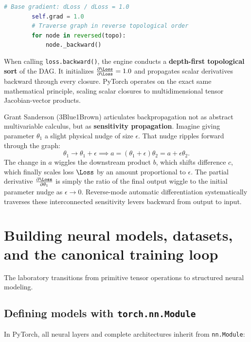 \documentclass[../labs.tex]{subfiles}
\begin{document}
\begin{deepdive}
\begin{lstlisting}[language=Python, caption={Core structure of Andrej Karpathy's scalar autograd engine.}, label={lst:karpathy_micrograd}]
        # Base gradient: dLoss / dLoss = 1.0
        self.grad = 1.0
        # Traverse graph in reverse topological order
        for node in reversed(topo):
            node._backward()
\end{lstlisting}

When calling \texttt{loss.backward()}, the engine conducts a \textbf{depth-first topological sort} of the DAG. It initializes $\frac{\partial \Loss}{\partial \Loss} = 1.0$ and propagates scalar derivatives backward through every closure. PyTorch operates on the exact same mathematical principle, scaling scalar closures to multidimensional tensor Jacobian-vector products.
\end{deepdive}

\begin{intuition}
Grant Sanderson (3Blue1Brown) articulates backpropagation not as abstract multivariable calculus, but as \textbf{sensitivity propagation}.
Imagine giving parameter $\theta_1$ a slight physical nudge of size $\epsilon$. That nudge ripples forward through the graph:
\begin{equation}
\theta_1 \to \theta_1 + \epsilon \implies a = (\theta_1 + \epsilon)\theta_2 = a + \epsilon \theta_2.
\end{equation}
The change in $a$ wiggles the downstream product $b$, which shifts difference $c$, which finally scales loss $\Loss$ by an amount proportional to $\epsilon$. The partial derivative $\frac{\partial \Loss}{\partial \theta_1}$ is simply the ratio of the final output wiggle to the initial parameter nudge as $\epsilon \to 0$. Reverse-mode automatic differentiation systematically traverses these interconnected sensitivity levers backward from output to input.
\end{intuition}


\section{Building neural models, datasets, and the canonical training loop}

The laboratory transitions from primitive tensor operations to structured neural modeling.

\subsection{Defining models with \texttt{torch.nn.Module}}
In PyTorch, all neural layers and complete architectures inherit from \texttt{nn.Module}:
\end{document}
